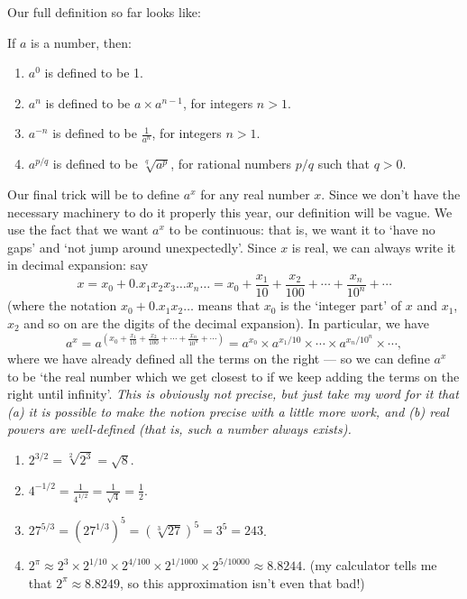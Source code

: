 Our full definition so far looks like:
\begin{defn}
  If $ a $ is a number, then:
  \begin{enumerate}
    \item $ a^0 $ is defined to be 1.
    \item $ a^n $ is defined to be $ a \times a^{n - 1} $, for integers $ n > 1 $.
    \item $ a^{-n} $ is defined to be $ \frac{1}{a^n} $, for integers $ n > 1 $.
    \item $ a^{p/q} $ is defined to be $ \sqrt[q]{a^p} $, for rational numbers $ p/q $ such that $ q > 0 $.
  \end{enumerate}
\end{defn}

Our final trick will be to define $ a^x $ for any real number $ x $. Since we don't have the necessary machinery to do it properly
this year, our definition will be vague. We use the fact that we want $ a^x $ to be continuous: that is, we want it to `have no gaps'
and `not jump around unexpectedly'. Since $ x $ is real, we can always write it in decimal expansion: say
\begin{displaymath}
  x = x_0 + 0.x_1x_2x_3\dots x_n \dots = x_0 + \frac{x_1}{10} + \frac{x_2}{100} + \cdots + \frac{x_n}{10^n} + \cdots
\end{displaymath}
(where the notation $ x_0 + 0.x_1x_2\dots $ means that $ x_0 $ is the `integer part' of $ x $ and $ x_1 $, $ x_2 $ and so on are the digits
of the decimal expansion). In particular, we have
\begin{displaymath}
  a^x = a^{\left(x_0 + \frac{x_1}{10} + \frac{x_2}{100} + \cdots + \frac{x_n}{10^n} + \cdots\right)} = a^{x_0} \times a^{x_1/10} \times \cdots \times a^{x_n/10^n} \times \cdots,
\end{displaymath}
where we have already defined all the terms on the right --- so we can define $ a^x $ to be `the real number which we get closest to if we keep adding the
terms on the right until infinity'. \emph{This is obviously not precise, but just take my word for it that (a) it is possible to make the notion precise
with a little more work, and (b) real powers are well-defined (that is, such a number always exists).}

\begin{ex}\leavevmode
  \begin{enumerate}
    \item $ 2^{3/2} = \sqrt[2]{2^3} = \sqrt{8} $.
    \item $ 4^{-1/2} = \frac{1}{4^{1/2}} = \frac{1}{\sqrt{4}} = \frac{1}{2} $.
    \item $ 27^{5/3} = \left(27^{1/3}\right)^5 = \left(\sqrt[3]{27}\right)^5 = 3^5 = 243 $.
    \item $ 2^{\pi} \approx 2^3 \times 2^{1/10} \times 2^{4/100} \times 2^{1/1000} \times 2^{5/10000} \approx 8.8244 $. (my calculator tells me
          that $ 2^\pi \approx 8.8249 $, so this approximation isn't even that bad!)
  \end{enumerate}
\end{ex}

